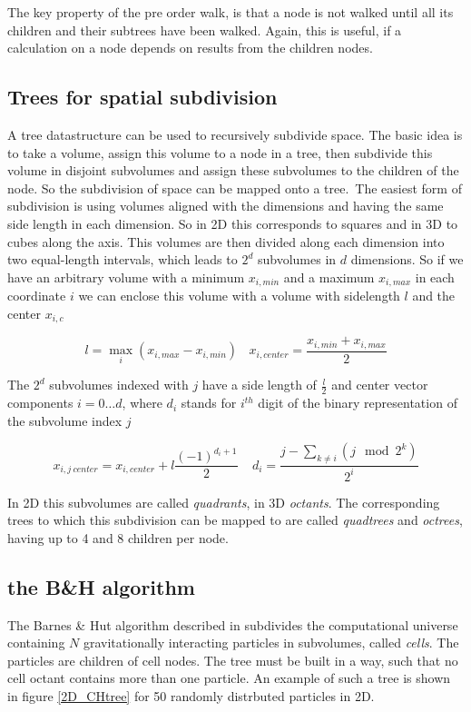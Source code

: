 The key property of the pre order walk, is that a node is not walked until all its children and their subtrees have been walked. Again, this is useful, if a calculation on a node depends on results from the children nodes.

\subsection{Trees for spatial subdivision}
A tree datastructure can be used to recursively subdivide space. The basic idea is to take a volume, assign this volume to a node in a tree, then subdivide this volume in disjoint subvolumes and assign these subvolumes to the children of the node. So the subdivision of space can be mapped onto a tree.\ The easiest form of subdivision is using volumes aligned with the dimensions and having the same side length in each dimension. So in 2D this corresponds to squares and in 3D to cubes along the axis. This volumes are then divided along each dimension into two equal-length intervals, which leads to $2^d$ subvolumes in $d$ dimensions. So if we have an arbitrary volume with a minimum $x_{i,min}$ and a maximum $x_{i,max}$ in each coordinate $i$ we can enclose this volume with a volume with sidelength $l$ and the center $x_{i,c}$

\begin{equation}
l = \max_{i} ( x_{i,max} - x_{i,min})  ~~~~ x_{i,center}= \frac{ x_{i,min} + x_{i,max} }{2}
\end{equation}

The $2^{d}$ subvolumes indexed with $j$ have a side length of $\frac{l}{2}$ and center vector components $i = 0 \dots d$, where $d_{i}$ stands for $i^{th}$ digit of the binary representation of the subvolume index $j$

\begin{equation}
x_{i, j~center} = x_{i,center} + l \frac{(-1)^{d_{i} + 1}}{2} ~~~~~ d_{i} = \frac{j  - \sum_{k \ne i} ( j \mod 2^{k} )}{2^{i}}
\end{equation}

In 2D this subvolumes are called \emph{quadrants}, in 3D \emph{octants}. The corresponding trees to which this subdivision can be mapped to are called \emph{quadtrees} and \emph{octrees}, having up to 4 and 8 children per node.

\subsection{the B\&H algorithm}
The Barnes \& Hut algorithm described in \cite{1986Natur.324..446B} subdivides the computational universe containing $N$ gravitationally interacting particles in subvolumes, called \emph{cells}. The particles are children of cell nodes. The tree must be built in a way, such that no cell octant contains more than one particle. An example of such a tree is shown in figure \ref{2D_CHtree} for 50 randomly distrbuted particles in 2D. 

